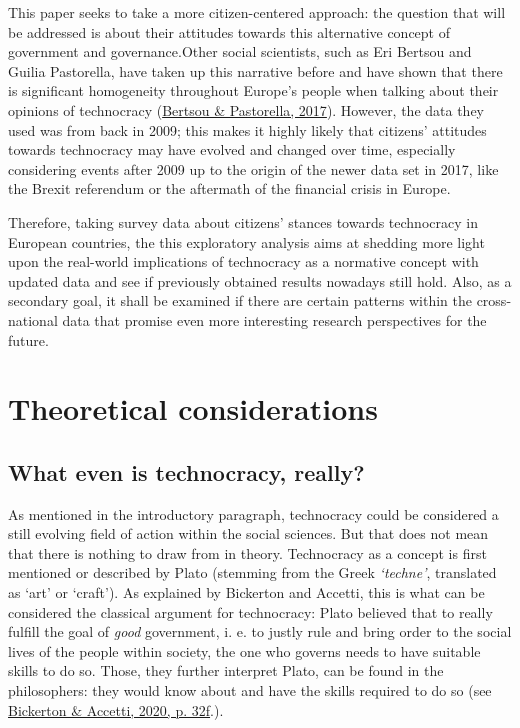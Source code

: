 \documentclass[
  12pt,
  english,
]{article}
\begin{document}
This paper seeks to take a more citizen-centered approach: the question
that will be addressed is about their attitudes towards this alternative
concept of government and governance.Other social scientists, such as
Eri Bertsou and Guilia Pastorella, have taken up this narrative before
and have shown that there is significant homogeneity throughout Europe's
people when talking about their opinions of technocracy
(\protect\hyperlink{ref-bertsou2017technocratic}{Bertsou \& Pastorella,
2017}). However, the data they used was from back in 2009; this makes it
highly likely that citizens' attitudes towards technocracy may have
evolved and changed over time, especially considering events after 2009
up to the origin of the newer data set in 2017, like the Brexit
referendum or the aftermath of the financial crisis in Europe.

Therefore, taking survey data about citizens' stances towards
technocracy in European countries, the this exploratory analysis aims at
shedding more light upon the real-world implications of technocracy as a
normative concept with updated data and see if previously obtained
results nowadays still hold. Also, as a secondary goal, it shall be
examined if there are certain patterns within the cross-national data
that promise even more interesting research perspectives for the future.

\newpage{}

\hypertarget{theoretical-considerations}{%
\section{Theoretical considerations}\label{theoretical-considerations}}

\hypertarget{what-even-is-technocracy-really}{%
\subsection{What even is technocracy,
really?}\label{what-even-is-technocracy-really}}

As mentioned in the introductory paragraph, technocracy could be
considered a still evolving field of action within the social sciences.
But that does not mean that there is nothing to draw from in theory.
Technocracy as a concept is first mentioned or described by Plato
(stemming from the Greek \emph{`techne'}, translated as `art' or
`craft'). As explained by Bickerton and Accetti, this is what can be
considered the classical argument for technocracy: Plato believed that
to really fulfill the goal of \emph{good} government, i. e. to justly
rule and bring order to the social lives of the people within society,
the one who governs needs to have suitable skills to do so. Those, they
further interpret Plato, can be found in the philosophers: they would
know about and have the skills required to do so (see
\protect\hyperlink{ref-bickerton2020technocracy}{Bickerton \& Accetti,
2020, p. 32f}.).
\end{document}

